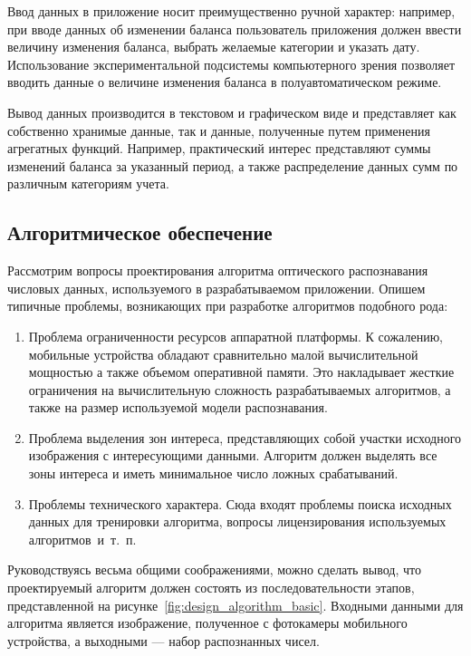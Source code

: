Ввод данных в приложение носит преимущественно ручной характер:
например, при вводе данных об изменении баланса
пользователь приложения должен ввести величину изменения баланса,
выбрать желаемые категории и указать дату.
Использование экспериментальной подсистемы компьютерного зрения
позволяет вводить данные о величине изменения баланса в
полуавтоматическом режиме.

Вывод данных производится в текстовом и графическом виде и
представляет как собственно хранимые данные, так и данные, полученные путем
применения агрегатных функций. Например, практический интерес представляют
суммы изменений баланса за указанный период, а также распределение
данных сумм по различным категориям учета.

\subsection{Алгоритмическое обеспечение}
\label{ssec:design_algorithm}

Рассмотрим вопросы проектирования алгоритма оптического
распознавания числовых данных, используемого в разрабатываемом приложении.
Опишем типичные проблемы, возникающих при разработке алгоритмов подобного рода:
\begin{enumerate}
  \item Проблема ограниченности ресурсов аппаратной платформы.
    К сожалению, мобильные устройства обладают сравнительно малой вычислительной
    мощностью а также объемом оперативной памяти.
    Это накладывает жесткие ограничения на вычислительную сложность
    разрабатываемых алгоритмов, а также на размер используемой модели распознавания.
  \item Проблема выделения зон интереса, представляющих собой участки исходного
    изображения с интересующими данными.
    Алгоритм должен выделять все зоны интереса и иметь минимальное
    число ложных срабатываний.
  \item Проблемы технического характера. Сюда входят проблемы поиска исходных данных для
    тренировки алгоритма, вопросы лицензирования используемых алгоритмов~и~т.~п.
\end{enumerate}

Руководствуясь весьма общими соображениями, можно сделать вывод,
что проектируемый алгоритм должен состоять из последовательности этапов,
представленной на рисунке~\ref{fig:design_algorithm_basic}.
Входными данными для алгоритма является изображение, полученное с фотокамеры
мобильного устройства, а выходными --- набор распознанных чисел.

